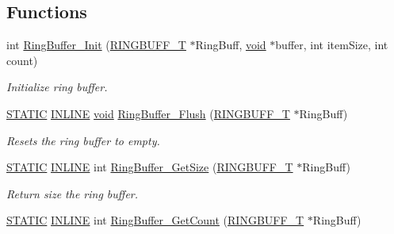 \subsection*{Functions}
\begin{DoxyCompactItemize}
\item 
int \hyperlink{group__Ring__Buffer_gaaf3bb51f2228ea1bea603e19c7eba5bb}{Ring\-Buffer\-\_\-\-Init} (\hyperlink{structRINGBUFF__T}{R\-I\-N\-G\-B\-U\-F\-F\-\_\-\-T} $\ast$Ring\-Buff, \hyperlink{Paradigm_2Tern__EE_2small_2portmacro_8h_a14d32f8130d3c0b212cfc751730b5b49}{void} $\ast$buffer, int item\-Size, int count)
\begin{DoxyCompactList}\small\item\em Initialize ring buffer. \end{DoxyCompactList}\item 
\hyperlink{group__LPC__Types__Public__Macros_ga10b2d890d871e1489bb02b7e70d9bdfb}{S\-T\-A\-T\-I\-C} \hyperlink{group__LPC__Types__Public__Types_ga2eb6f9e0395b47b8d5e3eeae4fe0c116}{I\-N\-L\-I\-N\-E} \hyperlink{Paradigm_2Tern__EE_2small_2portmacro_8h_a14d32f8130d3c0b212cfc751730b5b49}{void} \hyperlink{group__Ring__Buffer_ga5f66a5dd980ef03877cf8e0c96ad4ebb}{Ring\-Buffer\-\_\-\-Flush} (\hyperlink{structRINGBUFF__T}{R\-I\-N\-G\-B\-U\-F\-F\-\_\-\-T} $\ast$Ring\-Buff)
\begin{DoxyCompactList}\small\item\em Resets the ring buffer to empty. \end{DoxyCompactList}\item 
\hyperlink{group__LPC__Types__Public__Macros_ga10b2d890d871e1489bb02b7e70d9bdfb}{S\-T\-A\-T\-I\-C} \hyperlink{group__LPC__Types__Public__Types_ga2eb6f9e0395b47b8d5e3eeae4fe0c116}{I\-N\-L\-I\-N\-E} int \hyperlink{group__Ring__Buffer_ga2fc4b40b03afb19c8ea942da3cf3faf1}{Ring\-Buffer\-\_\-\-Get\-Size} (\hyperlink{structRINGBUFF__T}{R\-I\-N\-G\-B\-U\-F\-F\-\_\-\-T} $\ast$Ring\-Buff)
\begin{DoxyCompactList}\small\item\em Return size the ring buffer. \end{DoxyCompactList}\item 
\hyperlink{group__LPC__Types__Public__Macros_ga10b2d890d871e1489bb02b7e70d9bdfb}{S\-T\-A\-T\-I\-C} \hyperlink{group__LPC__Types__Public__Types_ga2eb6f9e0395b47b8d5e3eeae4fe0c116}{I\-N\-L\-I\-N\-E} int \hyperlink{group__Ring__Buffer_ga7b69777c35694637acaf39e6bfcc1822}{Ring\-Buffer\-\_\-\-Get\-Count} (\hyperlink{structRINGBUFF__T}{R\-I\-N\-G\-B\-U\-F\-F\-\_\-\-T} $\ast$Ring\-Buff)

\end{DoxyCompactItemize}
